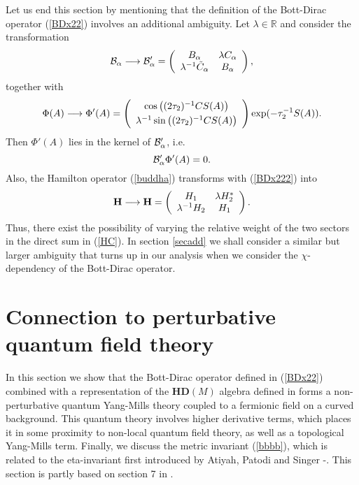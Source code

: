 \documentclass[12pt]{article}
\newcommand{\nn}{\nonumber}
\def\a{\alpha}
\def\cb{{\cal B}}
\begin{document}
Let us end this section by mentioning that the definition of the Bott-Dirac operator (\ref{BDx22}) involves an additional ambiguity. Let $\lambda\in\mathbb{R}$ and consider the transformation
\begin{eqnarray}
\cb_{\a} \longrightarrow  \cb'_{\a}=    \left(
\begin{array}{cc}
 B_\a  & \lambda C_\a \\ 
\lambda^{-1} \tilde{C}_\a    &  B_\a
\end{array}
\right),
\label{BDx222}
\end{eqnarray}
together with 
\begin{equation}
 \Phi (A) \longrightarrow  \Phi' (A) = \left(
\begin{array}{c}
\cos \left( ({2\tau_2})^{-1}  CS(A)\right)  
\vspace{0,1cm}
\\
\lambda^{-1} \sin\left( ({2\tau_2})^{-1}  CS(A)\right)  
\end{array}
\right)  \exp(-\tau_2^{-1}S(A)).
\nn
\end{equation}
Then $ \Phi' (A)$ lies in the kernel of $\cb_\a'$, i.e.
\begin{equation}
\cb'_{\a} \Phi'(A) = 0.
\nn
\end{equation}
Also, the Hamilton operator (\ref{buddha}) transforms with (\ref{BDx222}) into
\begin{eqnarray}
{\bf H}\longrightarrow {\bf H}=
\left(
\begin{array}{cc}
H_{1}  &  \lambda H^*_{2} \\
 \lambda^{-1} {H}_2 &  {H}_{1} 
\end{array}
\right).
\nn
\end{eqnarray}
Thus, there exist the possibility of varying the relative weight of the two sectors in the direct sum in (\ref{HC}). In section \ref{secadd} we shall consider a similar but larger ambiguity that turns up in our analysis when we consider the $\chi$-dependency of the Bott-Dirac operator.








\section{Connection to perturbative quantum field theory}
\label{conqft}

In this section we show that the Bott-Dirac operator defined in (\ref{BDx22}) combined with a representation of the $\mathbf{HD}(M)$ algebra defined in \cite{Aastrup:2012vq,AGnew} forms a non-perturbative quantum Yang-Mills theory coupled to a fermionic field on a curved background. This quantum theory involves higher derivative terms, which places it in some proximity to non-local quantum field theory, as well as a topological Yang-Mills term. Finally, we discuss the metric invariant (\ref{bbbb}), which is related to the eta-invariant first introduced by Atiyah, Patodi and Singer \cite{Atiyah}-\cite{AtiyahIII}.
This section is partly based on section 7 in \cite{Aastrup:2019yui}.
\end{document}
